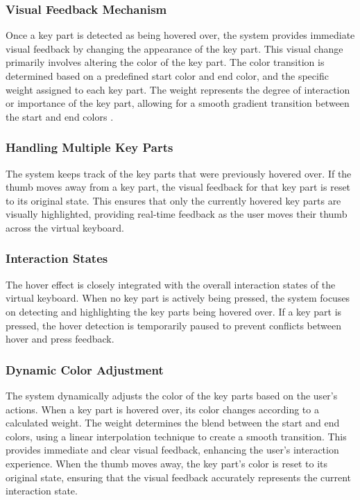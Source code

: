\subsubsection{Visual Feedback Mechanism}

Once a key part is detected as being hovered over, the system provides immediate visual feedback by changing the appearance of the key part. This visual change primarily involves altering the color of the key part. The color transition is determined based on a predefined start color and end color, and the specific weight assigned to each key part. The weight represents the degree of interaction or importance of the key part, allowing for a smooth gradient transition between the start and end colors \cite{douglas1999impact} .

\subsubsection{Handling Multiple Key Parts}

The system keeps track of the key parts that were previously hovered over. If the thumb moves away from a key part, the visual feedback for that key part is reset to its original state. This ensures that only the currently hovered key parts are visually highlighted, providing real-time feedback as the user moves their thumb across the virtual keyboard.

\subsubsection{Interaction States}

The hover effect is closely integrated with the overall interaction states of the virtual keyboard. When no key part is actively being pressed, the system focuses on detecting and highlighting the key parts being hovered over. If a key part is pressed, the hover detection is temporarily paused to prevent conflicts between hover and press feedback.

\subsubsection{Dynamic Color Adjustment}

The system dynamically adjusts the color of the key parts based on the user's actions. When a key part is hovered over, its color changes according to a calculated weight. The weight determines the blend between the start and end colors, using a linear interpolation technique to create a smooth transition. This provides immediate and clear visual feedback, enhancing the user's interaction experience. When the thumb moves away, the key part's color is reset to its original state, ensuring that the visual feedback accurately represents the current interaction state.

